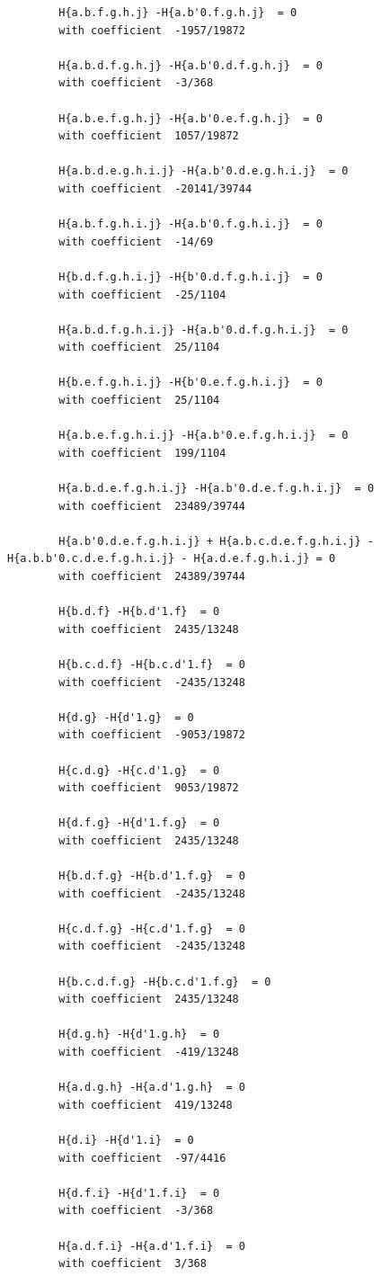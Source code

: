 \documentclass[11pt, a4paper]{kybernetika}
\begin{document}
\begin{verbatim}
		H{a.b.f.g.h.j} -H{a.b'0.f.g.h.j}  = 0
		with coefficient  -1957/19872
		
		H{a.b.d.f.g.h.j} -H{a.b'0.d.f.g.h.j}  = 0
		with coefficient  -3/368
		
		H{a.b.e.f.g.h.j} -H{a.b'0.e.f.g.h.j}  = 0
		with coefficient  1057/19872
		
		H{a.b.d.e.g.h.i.j} -H{a.b'0.d.e.g.h.i.j}  = 0
		with coefficient  -20141/39744
		
		H{a.b.f.g.h.i.j} -H{a.b'0.f.g.h.i.j}  = 0
		with coefficient  -14/69
		
		H{b.d.f.g.h.i.j} -H{b'0.d.f.g.h.i.j}  = 0
		with coefficient  -25/1104
		
		H{a.b.d.f.g.h.i.j} -H{a.b'0.d.f.g.h.i.j}  = 0
		with coefficient  25/1104
		
		H{b.e.f.g.h.i.j} -H{b'0.e.f.g.h.i.j}  = 0
		with coefficient  25/1104
		
		H{a.b.e.f.g.h.i.j} -H{a.b'0.e.f.g.h.i.j}  = 0
		with coefficient  199/1104
		
		H{a.b.d.e.f.g.h.i.j} -H{a.b'0.d.e.f.g.h.i.j}  = 0
		with coefficient  23489/39744
		
		H{a.b'0.d.e.f.g.h.i.j} + H{a.b.c.d.e.f.g.h.i.j} - H{a.b.b'0.c.d.e.f.g.h.i.j} - H{a.d.e.f.g.h.i.j} = 0
		with coefficient  24389/39744
		
		H{b.d.f} -H{b.d'1.f}  = 0
		with coefficient  2435/13248
		
		H{b.c.d.f} -H{b.c.d'1.f}  = 0
		with coefficient  -2435/13248
		
		H{d.g} -H{d'1.g}  = 0
		with coefficient  -9053/19872
		
		H{c.d.g} -H{c.d'1.g}  = 0
		with coefficient  9053/19872
		
		H{d.f.g} -H{d'1.f.g}  = 0
		with coefficient  2435/13248
		
		H{b.d.f.g} -H{b.d'1.f.g}  = 0
		with coefficient  -2435/13248
		
		H{c.d.f.g} -H{c.d'1.f.g}  = 0
		with coefficient  -2435/13248
		
		H{b.c.d.f.g} -H{b.c.d'1.f.g}  = 0
		with coefficient  2435/13248
		
		H{d.g.h} -H{d'1.g.h}  = 0
		with coefficient  -419/13248
		
		H{a.d.g.h} -H{a.d'1.g.h}  = 0
		with coefficient  419/13248
		
		H{d.i} -H{d'1.i}  = 0
		with coefficient  -97/4416
		
		H{d.f.i} -H{d'1.f.i}  = 0
		with coefficient  -3/368
		
		H{a.d.f.i} -H{a.d'1.f.i}  = 0
		with coefficient  3/368
		

\end{verbatim}
\end{document}
